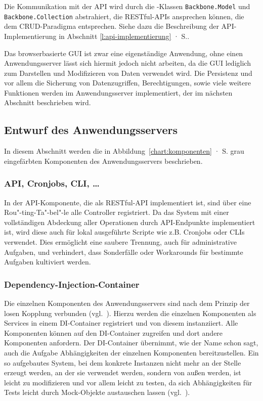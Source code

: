 Die Kommunikation mit der API wird durch die -Klassen \texttt{Backbone.Model} und \texttt{Backbone.Collection} abstrahiert, die RESTful-APIs ansprechen können, die dem CRUD-Paradigma entsprechen. Siehe dazu die Beschreibung der API-Implementierung in Abschnitt \ref{l:api-implementierung} · S.\pageref{l:api-implementierung}.

\secbar

Das browserbasierte GUI ist zwar eine eigenständige Anwendung, ohne einen Anwendungsserver lässt sich hiermit jedoch nicht arbeiten, da die GUI lediglich zum Darstellen und Modifizieren von Daten verwendet wird. Die Persistenz und vor allem die Sicherung von Datenzugriffen, Berechtigungen, sowie viele weitere Funktionen werden im Anwendungsserver implementiert, der im nächsten Abschnitt beschrieben wird.

\pagebreak

\subsection{Entwurf des Anwendungsservers}\label{l:entwurf-server}

In diesem Abschnitt werden die in Abbildung~\ref{chart:komponenten} · S.\pageref{chart:komponenten} grau eingefärbten Komponenten des Anwendungsservers beschrieben.

\subsubsection{API, Cronjobs, CLI, …}

In der API-Komponente, die als RESTful-API implementiert ist, sind über eine Rou"-ting-Ta"-bel"-le alle Controller registriert. Da das System mit einer vollständigen Abdeckung aller Operationen durch API-Endpunkte implementiert ist, wird diese auch für lokal ausgeführte Scripte wie z.B. Cronjobs oder CLIs verwendet. Dies ermöglicht eine saubere Trennung, auch für administrative Aufgaben, und verhindert, dass Sonderfälle oder Workarounds für bestimmte Aufgaben kultiviert werden.

\subsubsection{Dependency-Injection-Container}

Die einzelnen Komponenten des Anwendungsservers sind nach dem Prinzip der losen Kopplung verbunden (vgl.~\cite[S.62]{hn-web20}). Hierzu werden die einzelnen Komponenten als Services in einem DI-Container registriert und von diesem instanziiert. Alle Komponenten können auf den DI-Container zugreifen und dort andere Komponenten anfordern. Der DI-Container übernimmt, wie der Name schon sagt, auch die Aufgabe Abhängigkeiten der einzelnen Komponenten bereitzustellen. Ein so aufgebautes System, bei dem konkrete Instanzen nicht mehr an der Stelle erzeugt werden, an der sie verwendet werden, sondern von außen  werden, ist leicht zu modifizieren und vor allem leicht zu testen, da sich Abhängigkeiten für Tests leicht durch Mock-Objekte austauschen lassen (vgl.~\cite[Kap.2]{freeman2009growing}).

